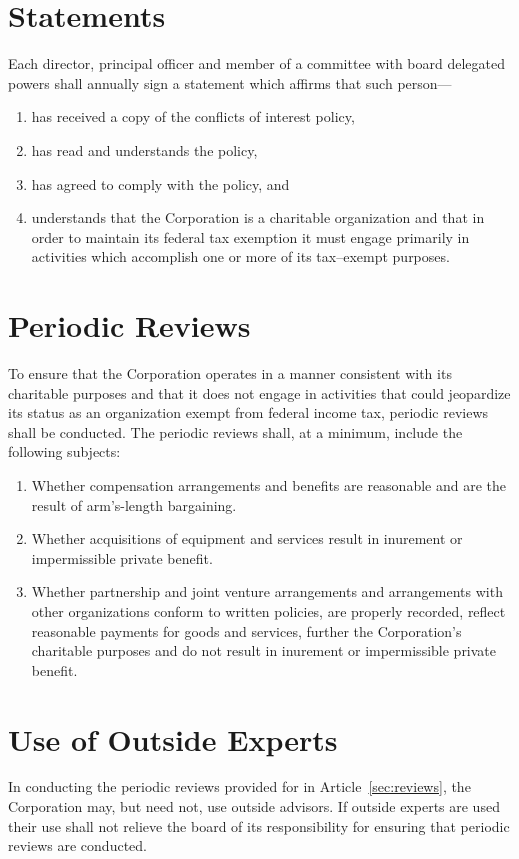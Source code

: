 \documentclass[12pt]{article}
\begin{document}
\section{Statements}

Each director, principal officer and member of a committee with board delegated powers shall annually sign a statement which affirms that such person---

\begin{enumerate}
\item has received a copy of the conflicts of interest policy, 

\item has read and understands the policy, 

\item has agreed to comply with the policy, and 

\item understands that the Corporation is a charitable organization and that in order to maintain its federal tax exemption it must engage primarily in activities which accomplish one or more of its tax--exempt purposes. 
\end{enumerate}

\section{Periodic Reviews}\label{sec:reviews}

To ensure that the Corporation operates in a manner consistent with its charitable purposes and that it does not engage in activities that could jeopardize its status as an organization exempt from federal income tax, periodic reviews shall be conducted. The periodic reviews shall, at a minimum, include the following subjects: 

\begin{enumerate}
\item Whether compensation arrangements and benefits are reasonable and are the result of arm's-length bargaining. 

\item Whether acquisitions of equipment and services result in inurement or impermissible private benefit. 

\item Whether partnership and joint venture arrangements and arrangements with other organizations conform to written policies, are properly recorded, reflect reasonable payments for goods and services, further the Corporation's charitable purposes and do not result in inurement or impermissible private benefit. 

\end{enumerate}

\section{Use of Outside Experts}\label{sec:experts}

In conducting the periodic reviews provided for in Article~\vref{sec:reviews}, the Corporation may, but need not, use outside advisors. If outside experts are used their use shall not relieve the board of its responsibility for ensuring that periodic reviews are conducted. 
\end{document}
